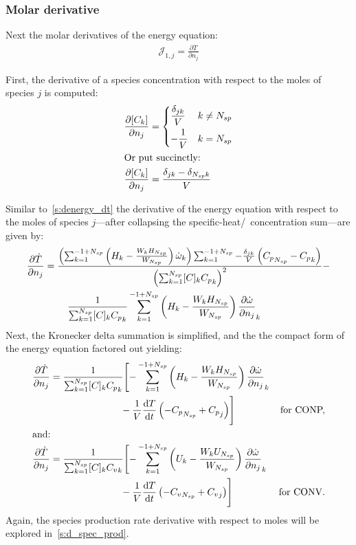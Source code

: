\documentclass[12pt]{article}
\newcommand{\ns}{N_{sp}}
\newcommand{\conp}{CONP}
\newcommand{\conv}{CONV}
\newcommand{\dconp}{\ifmmode\text{for \conp,}\else for \conp,\fi}
\newcommand{\dconv}{\ifmmode\text{for \conv,}\else for \conv.\fi}
\begin{document}
\subsubsection{Molar derivative}
Next the molar derivatives of the energy equation:
\begin{align}
 \mathcal{J}_{1,j} = \frac{\partial\dot{T}}{\partial{n_j}}
\end{align}

First, the derivative of a species concentration with respect to the moles of species $j$ is computed:
\begin{align}
 \frac{\partial [C_k]}{\partial n_j} &=
 \begin{dcases}
 \frac{\delta_{j k}}{V} & k \ne \ns \\
 -\frac{1}{V} & k = \ns
 \end{dcases} \\
\intertext{Or put succinctly:}
\label{e:dck_dnj}
\frac{\partial [C_k]}{\partial n_j} &= \frac{\delta_{j k} - \delta_{\ns k}}{V}
\end{align}

Similar to~\cref{s:denergy_dt} the derivative of the energy equation with respect to the moles of species $j$---after collapsing the specific-heat\slash~concentration sum---are given by:
\begin{align}
 \frac{\partial\dot{T}}{\partial{n_j}} &= \frac{\left(\sum_{k=1}^{-1 + \ns} \left(H_{k} - \frac{W_{k} H_{\ns}}{W_{\ns}}\right) \dot{\omega}_{k}\right) \sum_{k=1}^{-1 + \ns} - \frac{\delta_{j k}}{V} \left({C_p}_{\ns} - {C_p}_{k}\right)}{\left(\sum_{k=1}^{\ns} [C]_{k} {C_p}_{k}\right)^{2}} - \nonumber \\ 
				       & \mathindent \frac{1}{\sum_{k=1}^{\ns} [C]_{k} {C_p}_{k}} \sum_{k=1}^{-1 + \ns} \left(H_{k} - \frac{W_{k} H_{\ns}}{W_{\ns}}\right) \frac{\partial \dot{\omega} }{\partial {n_j} }_{k}
\end{align}
Next, the Kronecker delta summation is simplified, and the the compact form of the energy equation factored out yielding:
\begin{subequations}
\begin{align}
 \frac{\partial\dot{T}}{\partial{n_j}} &= \frac{1}{\sum_{k=1}^{\ns} [C]_{k} {C_p}_{k}} \Biggl[- \sum_{k=1}^{-1 + \ns} \left(H_{k} - \frac{W_{k} H_{\ns}}{W_{\ns}}\right) \frac{\partial \dot{\omega} }{\partial {n_j} }_{k} & \nonumber \\
				       &  \mathindent[largerindentand] - \frac{1}{V} \frac{\text{d} T }{\text{d} t } \left(- {C_p}_{\ns} + {C_p}_{j}\right)\Biggr] & \text{\dconp} \\
\intertext{and:}
 \frac{\partial\dot{T}}{\partial{n_j}} &= \frac{1}{\sum_{k=1}^{\ns} [C]_{k} {C_v}_{k}} \Biggl[- \sum_{k=1}^{-1 + \ns} \left(U_{k} - \frac{W_{k} U_{\ns}}{W_{\ns}}\right) \frac{\partial \dot{\omega} }{\partial {n_j} }_{k} & \nonumber \\ 
				       & \mathindent[largerindentand] - \frac{1}{V} \frac{\text{d} T }{\text{d} t } \left(- {C_v}_{\ns} + {C_v}_{j}\right) \Biggr] & \text{\dconv}
\end{align}
\end{subequations}
Again, the species production rate derivative with respect to moles will be explored in~\cref{s:d_spec_prod}.
\end{document}
